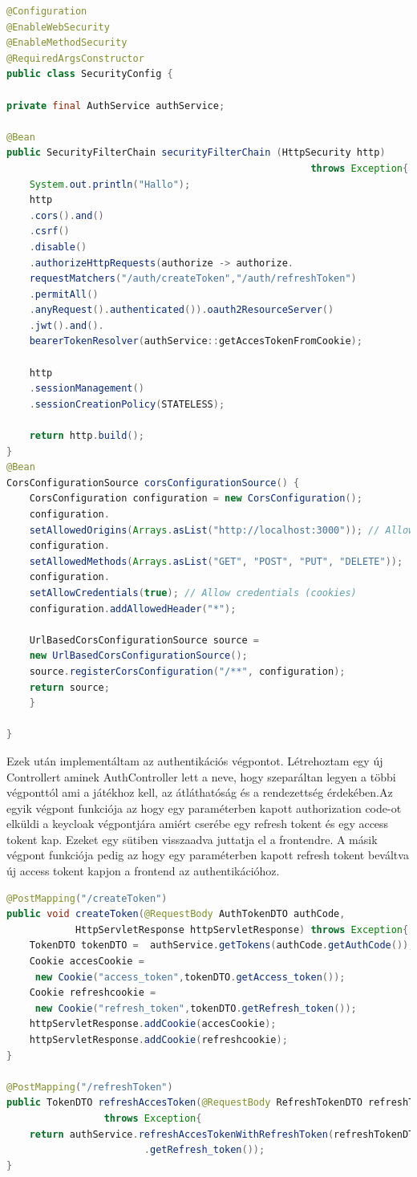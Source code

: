 \documentclass[a4paper,twoside]{article}
\begin{document}
\begin{lstlisting}[language=java,caption={SecurityConfig implementálása},captionpos=b]
@Configuration
@EnableWebSecurity
@EnableMethodSecurity
@RequiredArgsConstructor
public class SecurityConfig {
	
private final AuthService authService;

@Bean
public SecurityFilterChain securityFilterChain (HttpSecurity http)
													 throws Exception{
	System.out.println("Hallo");
	http
	.cors().and()
	.csrf()
	.disable()
	.authorizeHttpRequests(authorize -> authorize.
	requestMatchers("/auth/createToken","/auth/refreshToken")
	.permitAll()
	.anyRequest().authenticated()).oauth2ResourceServer()
	.jwt().and().
	bearerTokenResolver(authService::getAccesTokenFromCookie);
	
	http
	.sessionManagement()
	.sessionCreationPolicy(STATELESS);
	
	return http.build();
}
@Bean
CorsConfigurationSource corsConfigurationSource() {
	CorsConfiguration configuration = new CorsConfiguration();
	configuration.
	setAllowedOrigins(Arrays.asList("http://localhost:3000")); // Allow your frontend origin
	configuration.
	setAllowedMethods(Arrays.asList("GET", "POST", "PUT", "DELETE"));
	configuration.
	setAllowCredentials(true); // Allow credentials (cookies)
	configuration.addAllowedHeader("*");
		
	UrlBasedCorsConfigurationSource source = 
	new UrlBasedCorsConfigurationSource();
	source.registerCorsConfiguration("/**", configuration);
	return source;
	}
	
}
\end{lstlisting}

Ezek után implementáltam az authentikációs végpontot. Létrehoztam egy új Controllert aminek AuthController lett a neve,
hogy szeparáltan legyen a többi végponttól ami a játékhoz kell, az átláthatóság és a rendezettség érdekében.Az egyik végpont 
funkciója az hogy egy paraméterben kapott authorization code-ot elküldi a keycloak végpontjára amiért cserébe egy refresh tokent és egy access tokent kap.
Ezeket egy sütiben visszaadva juttatja el a frontendre. A másik végpont funkciója pedig az hogy egy paraméterben kapott refresh tokent beváltva új access tokent kapjon a frontend az authentikációhoz.  
\begin{lstlisting}[language=java,caption={Authentikációs végpont},captionpos=b]
@PostMapping("/createToken")
public void createToken(@RequestBody AuthTokenDTO authCode,
			HttpServletResponse httpServletResponse) throws Exception{
	TokenDTO tokenDTO =  authService.getTokens(authCode.getAuthCode());
	Cookie accesCookie =
	 new Cookie("access_token",tokenDTO.getAccess_token());
	Cookie refreshcookie =
	 new Cookie("refresh_token",tokenDTO.getRefresh_token());
	httpServletResponse.addCookie(accesCookie);
	httpServletResponse.addCookie(refreshcookie);
}

@PostMapping("/refreshToken")
public TokenDTO refreshAccesToken(@RequestBody RefreshTokenDTO refreshTokenDTO)
				 throws Exception{
	return authService.refreshAccesTokenWithRefreshToken(refreshTokenDTO
						.getRefresh_token());
}
\end{lstlisting}
\end{document}
